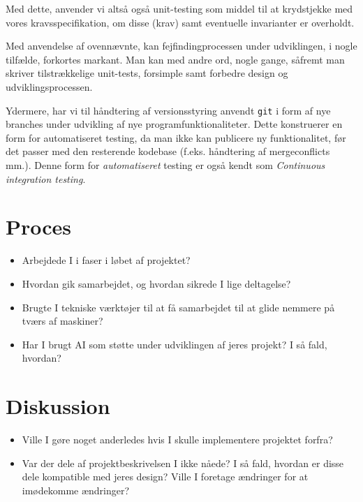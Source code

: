 \documentclass{article}
\newcommand{\code}[1]{\small\texttt{#1}}
\theoremstyle{mytheoremstyle}
\theoremstyle{mytheoremstyle}
\theoremstyle{myproblemstyle}
\begin{document}
Med dette, anvender vi altså også unit-testing som middel til at krydstjekke med
vores kravsspecifikation, om disse (krav) samt eventuelle invarianter er
overholdt.

Med anvendelse af ovennævnte, kan fejfindingprocessen under udviklingen, i nogle
tilfælde, forkortes markant. Man kan med andre ord, nogle gange, såfremt man
skriver tilstrækkelige unit-tests, forsimple samt forbedre design og
udviklingsprocessen.

Ydermere, har vi til håndtering af versionsstyring anvendt \code{git} i form af
nye branches under udvikling af nye programfunktionaliteter. Dette konstruerer
en form for automatiseret testing, da man ikke kan publicere ny funktionalitet,
før det passer med den resterende kodebase (f.eks. håndtering af mergeconflicts
mm.). Denne form for \textit{automatiseret} testing er også kendt som
\textit{Continuous integration testing}.

\textcolor{ocre}{}


\section{Proces}\label{sec:Proces} %
\begin{itemize}
  \item Arbejdede I i faser i løbet af projektet?
  \item Hvordan gik samarbejdet, og hvordan sikrede I lige deltagelse?
  \item Brugte I tekniske værktøjer til at få samarbejdet til at glide nemmere
  på tværs af maskiner?
  \item Har I brugt AI som støtte under udviklingen af jeres projekt? I så fald,
  hvordan?
\end{itemize}

\section{Diskussion}\label{sec:Diskussion} %
\begin{itemize}
  \item Ville I gøre noget anderledes hvis I skulle implementere projektet
  forfra?
  \item Var der dele af projektbeskrivelsen I ikke nåede? I så fald, hvordan er
  disse dele kompatible med jeres design? Ville I foretage ændringer for at
  imødekomme ændringer?
\end{itemize}
\end{document}

